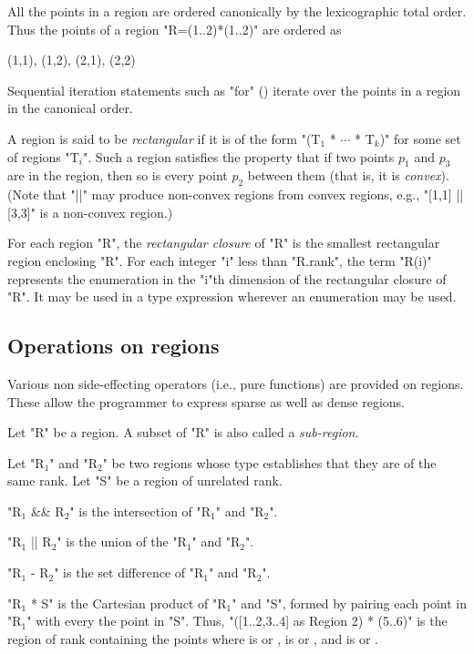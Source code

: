All the points in a region are ordered canonically by the
lexicographic total order. Thus the points of a region \xcd"R=(1..2)*(1..2)"
are ordered as 
\begin{xten}
(1,1), (1,2), (2,1), (2,2)
\end{xten}
Sequential iteration statements such as \xcd"for" ()
iterate over the points in a region in the canonical order.

A region is said to be {\em rectangular} if it is of
the form \xcdmath"(T$_1$ * $\cdots$ * T$_k$)" for some set of regions
\xcdmath"T$_i$". Such a
region satisfies the property that if two points $p_1$ and $p_3$ are
in the region, then so is every point $p_2$ between them (that is, it is {\em convex}). 
(Note that \xcd"||" may produce non-convex regions from convex regions, e.g.,
\xcd"[1,1] || [3,3]" is a non-convex region.)

For each region \xcd"R", the {\em rectangular closure} of \xcd"R" is the
smallest rectangular region enclosing \xcd"R".  For each integer \xcd"i"
less than \xcd"R.rank", the term \xcd"R(i)" represents the enumeration
in the \xcd"i"th dimension of the rectangular closure of \xcd"R". It may be
used in a type expression wherever an enumeration may be used.

\subsection{Operations on regions}
Various non side-effecting operators (i.e., pure functions) are
provided on regions. These allow the programmer to express sparse as
well as dense regions.

Let \xcd"R" be a region. A subset of \xcd"R" is also called a
{\em sub-region}.

Let \xcdmath"R$_1$" and \xcdmath"R$_2$" be two regions whose type
establishes that they are of the same rank. Let 
\xcdmath"S" be a region of unrelated rank.

\xcdmath"R$_1$ && R$_2$" is the intersection of \xcdmath"R$_1$" and
\xcdmath"R$_2$". 


\xcdmath"R$_1$ || R$_2$" is the union of the \xcdmath"R$_1$" and
\xcdmath"R$_2$".

\xcdmath"R$_1$ - R$_2$" is the set difference of \xcdmath"R$_1$" and
\xcdmath"R$_2$".

\xcdmath"R$_1$ * S" is the Cartesian product of \xcdmath"R$_1$" and
\xcdmath"S",  formed by pairing each point in \xcdmath"R$_1$" with every the point in \xcdmath"S".
Thus, \xcd"([1..2,3..4] as Region 2) * (5..6)"
is the region of rank  containing the points 
where  is  or , 
 is  or , and
 is  or . 


